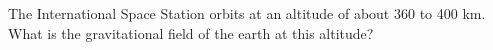 The International Space Station orbits at an altitude of about 360 to 400 km.
        What is the gravitational field of the earth at this altitude?\answercheck
